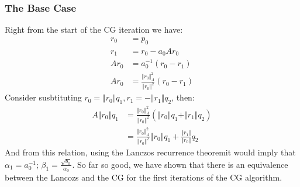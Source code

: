 \documentclass[]{article}
\theoremstyle{definition}
\begin{document}
        \subsubsection{The Base Case}
            Right from the start of the CG iteration we have: 
            \begin{align}
                r_0 &= p_0
                \\
                r_1 &= r_0 - a_0Ar_0
                \\
                Ar_0 &= a_0^{-1}(r_0 - r_1)
                \\
                Ar_0 &= \frac{\Vert r_0\Vert_A^2}{\Vert r_0\Vert^2}(r_0 - r_1)
            \end{align}
            Consider susbtituting $r_0 = \Vert r_0\Vert q_1, r_1 = -\Vert r_1\Vert q_2$, then: 
            \begin{align}
                A\Vert r_0\Vert q_1 
                &= \frac{\Vert r_0\Vert_A^2}{\Vert r_0\Vert^2}\left(
                    \Vert r_0\Vert q_1 + \Vert r_1\Vert q_2
                \right)
                \\
                &= 
                \frac{\Vert r_0\Vert_A^2}{\Vert r_0\Vert^2}\Vert r_0\Vert q_1 + 
                    \frac{\Vert r_1\Vert}{\Vert r_0\Vert} q_2
            \end{align}
            And from this relation, using the Lanczos recurrence theoremit would imply that $\alpha_1 = a_0^{-1}$; $\beta_1 = \frac{\sqrt{b_0}}{\alpha_0}$. So far so good, we have shown that there is an equivalence between the Lancozs and the CG for the first iterations of the CG algorithm. 
\end{document}

